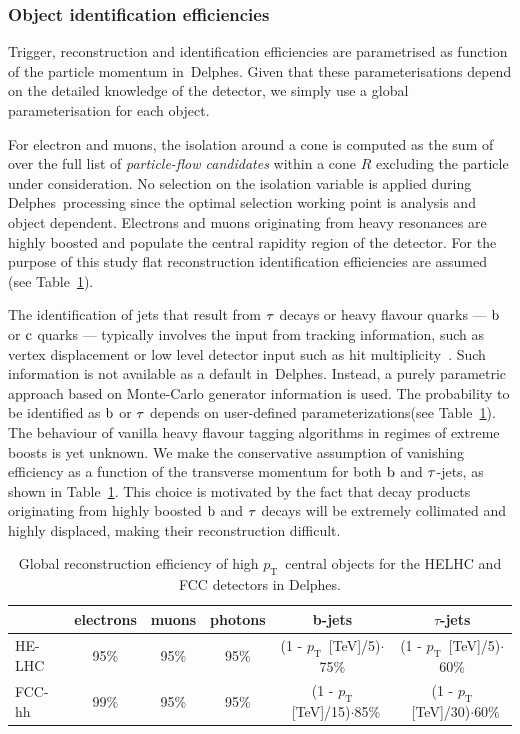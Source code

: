 \documentclass[a4paper,11pt]{article}
\newcommand{\pt}{\ensuremath{p_{\text{T}}}}
\newcommand{\delphes}{{\sc Delphes}}
\begin{document}
\subsubsection{Object identification efficiencies}
\label{appsub:objid}

Trigger, reconstruction and identification efficiencies are parametrised as function of the particle momentum in~\delphes{}. Given that these parameterisations depend on the detailed knowledge of the detector, we simply use a global parameterisation for each object.

For electron and muons, the isolation around a cone is computed as the sum of over the full list of \emph{particle-flow candidates} within a cone $R$ excluding the particle under consideration. No selection on the isolation variable is applied during \delphes\ processing since the optimal selection working point is analysis and object dependent. Electrons and muons originating from heavy resonances are highly boosted and populate the central rapidity region of the detector. For the purpose of this study flat reconstruction identification efficiencies are assumed (see Table~\ref{tab:effs}).

The identification of jets that result from $\rm{\tau}$ decays or heavy flavour quarks --- $\rm{b}$ or $\rm{c}$ quarks --- typically involves the input from tracking information, such as vertex displacement or low level detector input such as hit multiplicity~\cite{PerezCodina:2631478,PerezCodina:2635893}. Such information is not available as a default in~\delphes{}. Instead, a purely parametric approach based on Monte-Carlo generator information is used. The probability to be identified as $\rm{b}$ or $\rm{\tau}$ depends on user-defined parameterizations(see Table~\ref{tab:effs}). The behaviour of vanilla heavy flavour tagging algorithms in regimes of extreme boosts is yet unknown. We make the conservative assumption of vanishing efficiency as a function of the transverse momentum for both $\rm{b}$ and $\rm{\tau}$-jets, as shown in Table~\ref{tab:effs}. This choice is motivated by the fact that decay products originating from highly boosted $\rm{b}$ and $\rm{\tau}$ decays will be extremely collimated and highly displaced, making their reconstruction difficult. 

\begin {table}[htb!]
\begin{center}
\begin{tabular}{ l | c | c | c | c | c }
  & electrons & muons & photons & b-jets & $\tau$-jets\\
  \hline
  \hline
HE-LHC & 95\% & 95\% & 95\% & (1 - \pt~[TeV]/5)$\cdot$75\% & (1 - \pt~[TeV]/5)$\cdot$60\%  \\
FCC-hh & 99\% & 95\% & 95\%  & (1 - \pt~[TeV]/15)$\cdot$85\% & (1 - \pt~[TeV]/30)$\cdot$60\% \\
\end{tabular}
\caption{Global reconstruction efficiency of high \pt\ central objects for the HELHC and FCC detectors in Delphes.}
\label{tab:effs}
\end{center}
\end{table}
\end{document}

